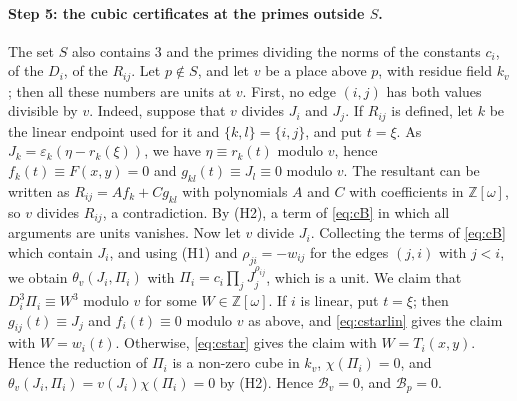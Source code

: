 \documentclass[11pt]{article}
\newcommand{\Z}{\mathbb{Z}}
\begin{document}
\paragraph{Step 5: the cubic certificates at the primes outside $S$.} The set $S$ also contains $3$ and the primes dividing the norms of the constants $c_i$, of the $D_i$, of the $R_{ij}$. Let $p\notin S$, and let $v$ be a place above $p$, with residue field $k_v$; then all these numbers are units at $v$. First, no edge $(i,j)$ has both values divisible by $v$. Indeed, suppose that $v$ divides $J_i$ and $J_j$. If $R_{ij}$ is defined, let $k$ be the linear endpoint used for it and $\{k,l\}=\{i,j\}$, and put $t=\xi$. As $J_k=\varepsilon_k(\eta-r_k(\xi))$, we have $\eta\equiv r_k(t)$ modulo $v$, hence $f_k(t)\equiv F(x,y)=0$ and $g_{kl}(t)\equiv J_l\equiv0$ modulo $v$. The resultant can be written as $R_{ij}=Af_k+Cg_{kl}$ with polynomials $A$ and $C$ with coefficients in $\Z[\omega]$, so $v$ divides $R_{ij}$, a contradiction. By (H2), a term of \eqref{eq:cB} in which all arguments are units vanishes. Now let $v$ divide $J_i$. Collecting the terms of \eqref{eq:cB} which contain $J_i$, and using (H1) and $\rho_{ji}=-w_{ij}$ for the edges $(j,i)$ with $j<i$, we obtain $\theta_v(J_i,\Pi_i)$ with $\Pi_i=c_i\prod_jJ_j^{\rho_{ij}}$, which is a unit. We claim that $D_i^3\Pi_i\equiv W^3$ modulo $v$ for some $W\in\Z[\omega]$. If $i$ is linear, put $t=\xi$; then $g_{ij}(t)\equiv J_j$ and $f_i(t)\equiv0$ modulo $v$ as above, and \eqref{eq:cstarlin} gives the claim with $W=w_i(t)$. Otherwise, \eqref{eq:cstar} gives the claim with $W=T_i(x,y)$. Hence the reduction of $\Pi_i$ is a non-zero cube in $k_v$, $\chi(\Pi_i)=0$, and $\theta_v(J_i,\Pi_i)=v(J_i)\chi(\Pi_i)=0$ by (H2). Hence $\mathcal B_v=0$, and $\mathcal B_p=0$.
\end{document}
